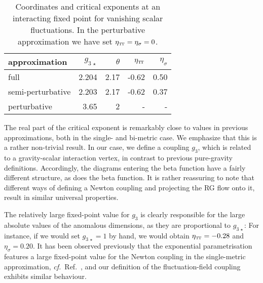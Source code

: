\documentclass[11pt]{book}
\newcommand\TTspace{ -1pt }
\newcommand\etaTT{ \eta_{\scriptscriptstyle{\mathrm{T\hspace{\TTspace}T}}} }
\newcommand\cf{\textit{cf.}\ }
\numberwithin{equation}{chapter}
\begin{document}
\begin{table}[]
  \begin{center}
    \begin{tabular}{ l r r r r }
      \toprule
      approximation      & $g_{3\,\star}$ & $\theta$ & $\etaTT$ & $\eta_{\sigma}$ \\
      \midrule
      full               & 2.204         & 2.17     & -0.62           & 0.50 \\
      semi-perturbative  & 2.203         & 2.17     & -0.62           & 0.37 \\
      perturbative       & 3.65          & 2        & -               & -    \\
      \bottomrule
    \end{tabular}
  \end{center}
  \caption[Coordinates and critical exponents of fixed points in perturbative approximation]
  {
    Coordinates and critical exponents at an interacting fixed point for vanishing scalar fluctuations.
    In the perturbative approximation we have set $\etaTT = \eta_{\sigma} = 0$.
  }
  \label{puregravityFP_table}
\end{table}

The real part of the critical exponent is remarkably close to values in previous approximations,
both in the single- and bi-metric case. We emphasize that this is a  rather non-trivial result.
In our case, we define a coupling $g_3$, which is related to a gravity-scalar interaction vertex,
in contrast to previous pure-gravity definitions.
Accordingly, the diagrams entering the beta function have a fairly different structure,
as does the beta function.
It is rather reassuring to note that different ways of defining a Newton coupling and projecting
the RG flow onto it, result in similar universal properties.

The relatively large fixed-point value for $g_3$ is clearly responsible for the large absolute
values of the anomalous dimensions, as they are proportional to $g_{3\,\star}$: For instance,
if we would set $g_{3\,\star}=1$ by hand, we would obtain $\etaTT = -0.28$ and $\eta_{\sigma} =0.20$.
It has been observed previously that the exponential parametrisation features a large fixed-point
value for the Newton coupling in the single-metric approximation, \cf Ref.~\cite{Percacci:2015wwa},
and our definition of the fluctuation-field coupling exhibits similar behaviour.
\end{document}
